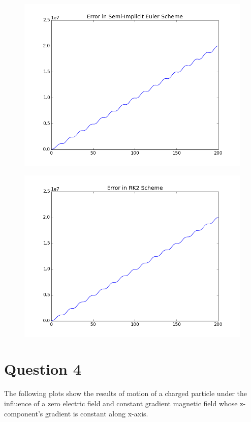 \documentclass[11pt, a4paper]{article}
\begin{document}
\begin{figure}[H]
 \centering
 \includegraphics[width = \textwidth]{q3_error_euler2.png}
\end{figure}
\begin{figure}[H]
 \centering
 \includegraphics[width = \textwidth]{q3_error_RK2.png}
\end{figure}

\section{Question 4}
The following plots show the results of motion of a charged particle under the influence of a zero electric field and constant gradient magnetic field whose z-component's gradient is constant along x-axis.
\end{document}
